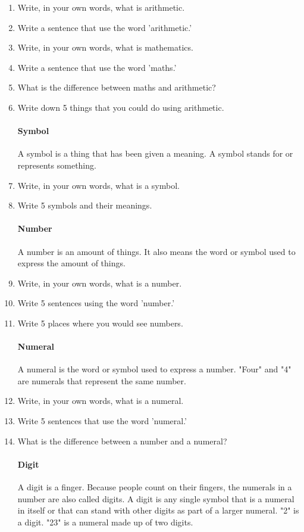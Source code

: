 \documentclass[12pt]{article}
\begin{document}
\begin{enumerate}
\item Write, in your own words, what is arithmetic.
\item Write a sentence that use the word 'arithmetic.'
\item Write, in your own words, what is mathematics.
\item Write a sentence that use the word 'maths.'
\item What is the difference between maths and arithmetic?
\item Write down 5 things that you could do using arithmetic.

\paragraph{Symbol}
A symbol is a thing that has been given a meaning. A symbol stands for or represents something.

\item Write, in your own words, what is a symbol.
\item Write 5 symbols and their meanings.

\paragraph{Number}
A number is an amount of things. It also means the word or symbol used to express the amount of things.

\item Write, in your own words, what is a number.
\item Write 5 sentences using the word 'number.'
\item Write 5 places where you would see numbers.

\paragraph{Numeral}
A numeral is the word or symbol used to express a number. "Four" and "4" are numerals that represent the same number.

\item Write, in your own words, what is a numeral.
\item Write 5 sentences that use the word 'numeral.'
\item What is the difference between a number and a numeral?

\paragraph{Digit}
A digit is a finger. Because people count on their fingers, the numerals in a number are also called digits. A digit is any single symbol that is a numeral in itself or that can stand with other digits as part of a larger numeral. "2" is a digit. "23" is a numeral made up of two digits.


\end{enumerate}
\end{document}
